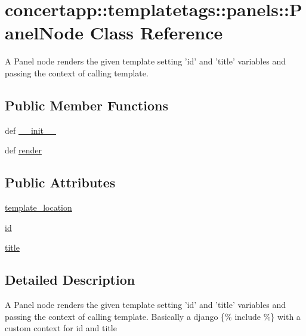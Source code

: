 \hypertarget{classconcertapp_1_1templatetags_1_1panels_1_1_panel_node}{
\section{concertapp::templatetags::panels::PanelNode Class Reference}
\label{classconcertapp_1_1templatetags_1_1panels_1_1_panel_node}
}


A Panel node renders the given template setting 'id' and 'title' variables and passing the context of calling template.  


\subsection*{Public Member Functions}
\begin{DoxyCompactItemize}
\item 
def \hyperlink{classconcertapp_1_1templatetags_1_1panels_1_1_panel_node_adb58165e7f46a89f8224e4eccef85601}{\_\-\_\-init\_\-\_\-}
\item 
def \hyperlink{classconcertapp_1_1templatetags_1_1panels_1_1_panel_node_a302445662551e2de36c2ba249cfb7c72}{render}
\end{DoxyCompactItemize}
\subsection*{Public Attributes}
\begin{DoxyCompactItemize}
\item 
\hyperlink{classconcertapp_1_1templatetags_1_1panels_1_1_panel_node_a7b00003363e500842809cf97ff714a18}{template\_\-location}
\item 
\hyperlink{classconcertapp_1_1templatetags_1_1panels_1_1_panel_node_a8c04582efa85e4e109e4dc026ac0cf22}{id}
\item 
\hyperlink{classconcertapp_1_1templatetags_1_1panels_1_1_panel_node_aa10c04ba4d289815ec84d468c8cfed99}{title}
\end{DoxyCompactItemize}


\subsection{Detailed Description}
A Panel node renders the given template setting 'id' and 'title' variables and passing the context of calling template. Basically a django \{\% include \%\} with a custom context for id and title 

